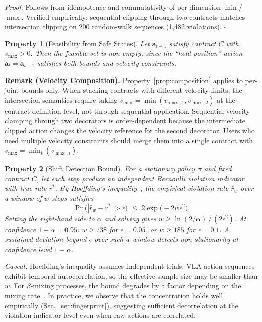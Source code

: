 \documentclass[conference]{IEEEtran}
\newtheorem{property}{Property}
\begin{document}
\textit{Proof.} Follows from idempotence and commutativity of per-dimension $\min$/$\max$. Verified empirically: sequential clipping through two contracts matches intersection clipping on 200 random-walk sequences (1{,}482 violations). \hfill $\square$

\begin{property}[Feasibility from Safe States]
\label{prop:deadlock}
Let $\mathbf{a}_{t-1}$ satisfy contract $C$ with $v_{\max} > 0$. Then the feasible set is non-empty, since the ``hold position'' action $\mathbf{a}_t = \mathbf{a}_{t-1}$ satisfies both bounds and velocity constraints.
\end{property}

\noindent\textbf{Remark (Velocity Composition).}
Property~\ref{prop:composition} applies to per-joint bounds only.
When stacking contracts with different velocity limits, the intersection semantics require taking $v_{\max} = \min(v_{\max,1}, v_{\max,2})$ at the contract definition level, not through sequential application.
Sequential velocity clamping through two decorators is order-dependent because the intermediate clipped action changes the velocity reference for the second decorator.
Users who need multiple velocity constraints should merge them into a single contract with $v_{\max} = \min_i(v_{\max,i})$.

\begin{property}[Shift Detection Bound]
\label{prop:shift}
For a stationary policy $\pi$ and fixed contract $C$, let each step produce an independent Bernoulli violation indicator with true rate $r^*$. By Hoeffding's inequality~\cite{hoeffding1963}, the empirical violation rate $\hat{r}_w$ over a window of $w$ steps satisfies
\begin{equation}
\Pr\!\bigl(|\hat{r}_w - r^*| > \epsilon\bigr) \;\le\; 2\exp\!\bigl(-2w\epsilon^2\bigr).
\label{eq:hoeffding}
\end{equation}
Setting the right-hand side to $\alpha$ and solving gives $w \ge \ln(2/\alpha)\,/\,(2\epsilon^2)$. At confidence $1{-}\alpha = 0.95$: $w \ge 738$ for $\epsilon = 0.05$, or $w \ge 185$ for $\epsilon = 0.1$. A sustained deviation beyond $\epsilon$ over such a window detects non-stationarity at confidence level $1{-}\alpha$.
\end{property}

\noindent\textit{Caveat.}
Hoeffding's inequality assumes independent trials. VLA action sequences exhibit temporal autocorrelation, so the effective sample size may be smaller than $w$. For $\beta$-mixing processes, the bound degrades by a factor depending on the mixing rate~\cite{yu1994}. In practice, we observe that the concentration holds well empirically (Sec.~\ref{sec:fingerprint}), suggesting sufficient decorrelation at the violation-indicator level even when raw actions are correlated.
\end{document}
